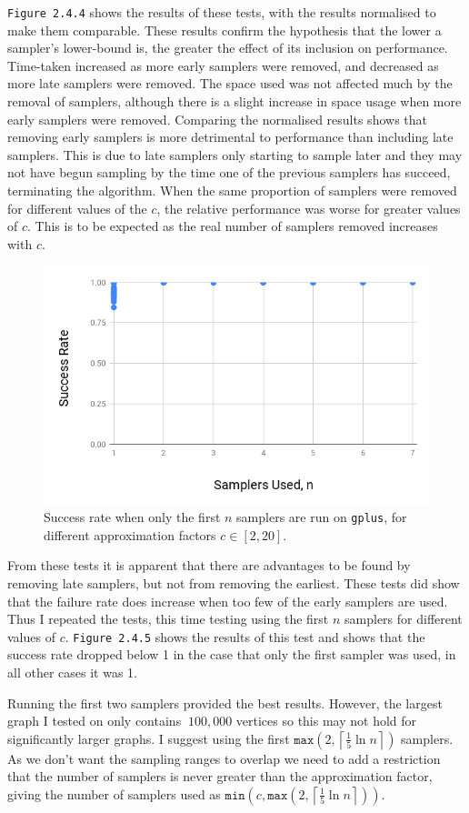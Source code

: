 \documentclass[11pt,twoside,a4paper]{report}
\begin{document}
\par \texttt{Figure 2.4.4} shows the results of these tests, with the results normalised to make them comparable. These results confirm the hypothesis that the lower a sampler's lower-bound is, the greater the effect of its inclusion on performance. Time-taken increased as more early samplers were removed, and decreased as more late samplers were removed. The space used was not affected much by the removal of samplers, although there is a slight increase in space usage when more early samplers were removed. Comparing the normalised results shows that removing early samplers is more detrimental to performance than including late samplers. This is due to late samplers only starting to sample later and they may not have begun sampling by the time one of the previous samplers has succeed, terminating the algorithm. When the same proportion of samplers were removed for different values of the  $c$, the relative performance was worse for greater values of $c$. This is to be expected as the real number of samplers removed increases with $c$.

\begin{figure}[H]
	\label{Figure 6}
	\centering
	\includegraphics[width=.5\textwidth]{img/gplusSuccessRate.png}
	\caption{Success rate when only the first $n$ samplers are run on \texttt{gplus}, for different approximation factors $c\in[2,20]$.}
\end{figure}

\par From these tests it is apparent that there are advantages to be found by removing late samplers, but not from removing the earliest. These tests did show that the failure rate does increase when too few of the early samplers are used. Thus I repeated the tests, this time testing using the first $n$ samplers for different values of $c$. \texttt{Figure 2.4.5} shows the results of this test and shows that the success rate dropped below 1 in the case that only the first sampler was used, in all other cases it was 1.

\par Running the first two samplers provided the best results. However, the largest graph I tested on only contains $~100,000$ vertices so this may not hold for significantly larger graphs. I suggest using the first $\mathtt{max}\left(2,\left\lceil\frac15\ln n\right\rceil\right)$ samplers. As we don't want the sampling ranges to overlap we need to add a restriction that the number of samplers is never greater than the approximation factor, giving the number of samplers used as $\mathtt{min}\left(c,\mathtt{max}\left(2,\left\lceil\frac15\ln n\right\rceil\right)\right)$.
\end{document}
